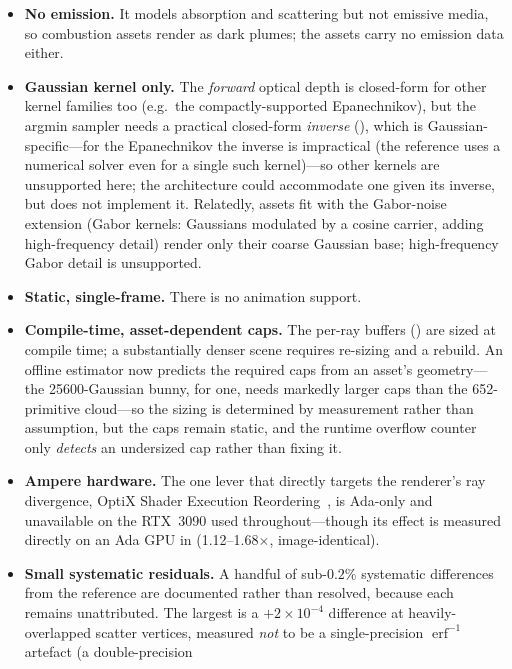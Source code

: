 \begin{itemize}
  \item \textbf{No emission.} It models absorption and scattering but not emissive media, so combustion
  assets render as dark plumes; the assets carry no emission data either.
  \item \textbf{Gaussian kernel only.} The \emph{forward} optical depth is closed-form for other kernel
  families too (e.g.\ the compactly-supported Epanechnikov), but the argmin sampler needs a practical
  closed-form \emph{inverse} (), which is Gaussian-specific---for the Epanechnikov
  the inverse is impractical (the reference uses a numerical solver even for a single such kernel)---so
  other kernels are unsupported here; the architecture could accommodate one given its inverse, but does
  not implement it. Relatedly, assets fit with the Gabor-noise extension (Gabor kernels: Gaussians modulated by a cosine
carrier, adding high-frequency detail) render only their coarse
  Gaussian base; high-frequency Gabor detail is unsupported.
  \item \textbf{Static, single-frame.} There is no animation support.
  \item \textbf{Compile-time, asset-dependent caps.} The per-ray buffers () are sized
  at compile time; a substantially denser scene requires re-sizing and a rebuild. An offline estimator
  now predicts the required caps from an asset's geometry---the \num{25600}-Gaussian bunny, for one,
  needs markedly larger caps than the \num{652}-primitive cloud---so the sizing is determined by
  measurement rather than assumption, but the caps remain static, and the runtime overflow counter only
  \emph{detects} an undersized cap rather than fixing it.
  \item \textbf{Ampere hardware.} The one lever that directly targets the renderer's ray divergence,
  OptiX Shader Execution Reordering~\cite{NvidiaSER2022}, is Ada-only and unavailable on the RTX~3090
  used throughout---though its effect is measured directly on an Ada GPU in 
  (\num{1.12}--\num{1.68}$\times$, image-identical).
  \item \textbf{Small systematic residuals.} A handful of sub-$0.2\%$ systematic differences from the
  reference are documented rather than resolved, because each remains unattributed. The largest
  is a ${+}2\times10^{-4}$ difference at heavily-overlapped scatter vertices, measured
  \emph{not} to be a single-precision $\operatorname{erf}^{-1}$ artefact (a double-precision

\end{itemize}
